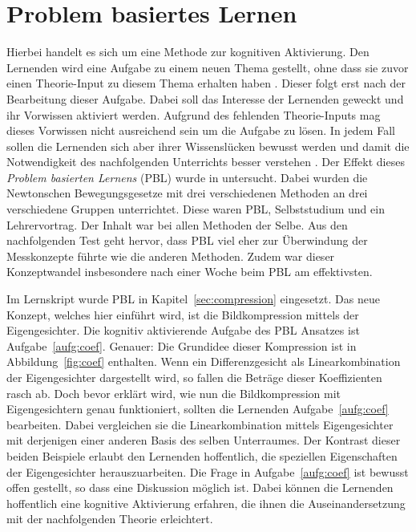 \section{Problem basiertes Lernen}
Hierbei handelt es sich um eine Methode zur kognitiven Aktivierung.
Den Lernenden wird eine Aufgabe zu einem neuen Thema gestellt, ohne dass sie zuvor einen Theorie-Input zu diesem Thema erhalten haben \cite{Loyens2015}.
Dieser folgt erst nach der Bearbeitung dieser Aufgabe.
Dabei soll das Interesse der Lernenden geweckt und ihr Vorwissen aktiviert werden.
Aufgrund des fehlenden Theorie-Inputs mag dieses Vorwissen nicht ausreichend sein um die Aufgabe zu lösen.
In jedem Fall sollen die Lernenden sich aber ihrer Wissenslücken bewusst werden und damit die Notwendigkeit des nachfolgenden Unterrichts besser verstehen \cite{Loyens2015}.
Der Effekt dieses \textit{Problem basierten Lernens} (PBL) wurde in \cite{Loyens2015} untersucht.
Dabei wurden die Newtonschen Bewegungsgesetze mit drei verschiedenen Methoden an drei verschiedene Gruppen unterrichtet.
Diese waren PBL, Selbststudium und ein Lehrervortrag.
Der Inhalt war bei allen Methoden der Selbe.
Aus den nachfolgenden Test geht hervor, dass PBL viel eher zur Überwindung der Messkonzepte führte wie die anderen Methoden.
Zudem war dieser Konzeptwandel insbesondere nach einer Woche beim PBL am effektivsten.

Im Lernskript wurde PBL in Kapitel~\ref{sec:compression} eingesetzt.
Das neue Konzept, welches hier einführt wird, ist die Bildkompression mittels der Eigengesichter.
Die kognitiv aktivierende Aufgabe des PBL Ansatzes ist Aufgabe~\ref{aufg:coef}.
Genauer: Die Grundidee dieser Kompression ist in Abbildung~\ref{fig:coef} enthalten.
Wenn ein Differenzgesicht als Linearkombination der Eigengesichter dargestellt wird, so fallen die Beträge dieser Koeffizienten rasch ab.
Doch bevor erklärt wird, wie nun die Bildkompression mit Eigengesichtern genau funktioniert, sollten die Lernenden Aufgabe~\ref{aufg:coef} bearbeiten.
Dabei vergleichen sie die Linearkombination mittels Eigengesichter mit derjenigen einer anderen Basis des selben Unterraumes.
Der Kontrast dieser beiden Beispiele erlaubt den Lernenden hoffentlich, die speziellen Eigenschaften der Eigengesichter herauszuarbeiten.
Die Frage in Aufgabe~\ref{aufg:coef} ist bewusst offen gestellt, so dass eine Diskussion möglich ist.
Dabei können die Lernenden hoffentlich eine kognitive Aktivierung erfahren, die ihnen die Auseinandersetzung mit der nachfolgenden Theorie erleichtert.